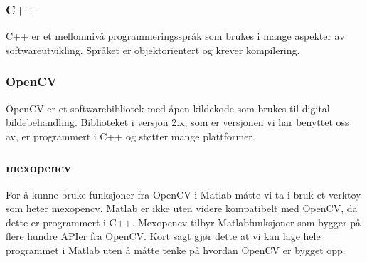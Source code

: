 \subsubsection{C++}
C++ er et mellomnivå programmeringsspråk som brukes i mange aspekter av softwareutvikling. Språket er objektorientert og krever kompilering.

\subsubsection{OpenCV}
OpenCV er et softwarebibliotek med åpen kildekode som brukes til digital bildebehandling. Biblioteket i versjon 2.x, som er versjonen vi har benyttet oss av, er programmert i C++ og støtter mange plattformer. \cite{docs:opencv}

\subsubsection{mexopencv}
For å kunne bruke funksjoner fra OpenCV i Matlab måtte vi ta i bruk et verktøy som heter mexopencv. Matlab er ikke uten videre kompatibelt med OpenCV, da dette er programmert i C++. Mexopencv tilbyr Matlabfunksjoner som bygger på flere hundre APIer fra OpenCV. \cite{mexopencv} Kort sagt gjør dette at vi kan lage hele programmet i Matlab uten å måtte tenke på hvordan OpenCV er bygget opp.